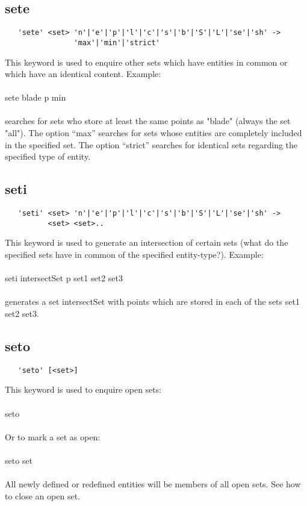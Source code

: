 \documentclass{article}
\begin{document}
\subsection{\label{sete}sete}
\begin{verbatim}
   'sete' <set> 'n'|'e'|'p'|'l'|'c'|'s'|'b'|'S'|'L'|'se'|'sh' ->
                'max'|'min'|'strict'
\end{verbatim}
This keyword is used to enquire other sets which have entities in common or which have an identical content. Example:\\\\sete blade p min\\\\ searches for sets who store at least the same points as "blade" (always the set "all"). The option ``max'' searches for sets whose entities are completely included in the specified set. The option ``strict'' searches for identical sets regarding the specified type of entity.

\subsection{\label{seti}seti}
\begin{verbatim}
   'seti' <set> 'n'|'e'|'p'|'l'|'c'|'s'|'b'|'S'|'L'|'se'|'sh' ->
          <set> <set>.. 
\end{verbatim}
This keyword is used to generate an intersection of certain sets (what do the specified sets have in common of the specified entity-type?). Example:\\\\seti intersectSet p set1 set2 set3\\\\generates a set intersectSet with points which are stored in each of the sets set1 set2 set3.

\subsection{\label{seto}seto}
\begin{verbatim}
   'seto' [<set>] 
\end{verbatim}
This keyword is used to enquire open sets:\\\\
seto\\\\
Or to mark a set as open:\\\\
seto set\\\\
All newly defined or redefined entities will be members of all open sets. See  how to close an open set.
\end{document}
